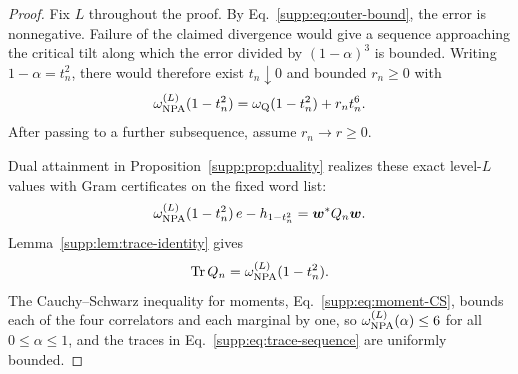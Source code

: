\documentclass[aps,prl,onecolumn,10pt,superscriptaddress,nofootinbib,longbibliography]{revtex4-2}
\theoremstyle{remark}
\newcommand{\Tr}{\operatorname{Tr}}
\begin{document}
\begin{proof}
Fix $L$ throughout the proof. By Eq.~\eqref{supp:eq:outer-bound}, the error is nonnegative. Failure of the claimed divergence would give a sequence approaching the critical tilt along which the error divided by $(1-\alpha)^3$ is bounded. Writing $1-\alpha=t_n^2$, there would therefore exist $t_n\downarrow0$ and bounded $r_n\geq0$ with
\begin{equation}
\omega_{\rm NPA}^{(L)}(1-t_n^2)=\omega_{\rm Q}(1-t_n^2)+r_nt_n^6.
\label{supp:eq:bounded-excess}
\end{equation}
After passing to a further subsequence, assume $r_n\to r\geq0$.

Dual attainment in Proposition~\ref{supp:prop:duality} realizes these exact level-$L$ values with Gram certificates on the fixed word list:
\begin{equation}
\omega_{\rm NPA}^{(L)}(1-t_n^2)\,e-h_{1-t_n^2}=\bm w^*Q_n\bm w.
\label{supp:eq:certificate-sequence}
\end{equation}
Lemma~\ref{supp:lem:trace-identity} gives
\begin{equation}
\Tr Q_n=\omega_{\rm NPA}^{(L)}(1-t_n^2).
\label{supp:eq:trace-sequence}
\end{equation}
The Cauchy--Schwarz inequality for moments, Eq.~\eqref{supp:eq:moment-CS}, bounds each of the four correlators and each marginal by one, so $\omega_{\rm NPA}^{(L)}(\alpha)\leq6$ for all $0\leq\alpha\leq1$, and the traces in Eq.~\eqref{supp:eq:trace-sequence} are uniformly bounded.


\end{proof}
\end{document}
